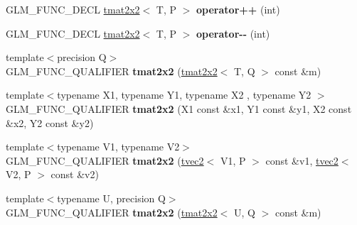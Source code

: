 \begin{DoxyCompactItemize}
\item 
\hypertarget{structglm_1_1detail_1_1tmat2x2_ab0857ca1fc8ebaf4f2999d64837efb08}{G\-L\-M\-\_\-\-F\-U\-N\-C\-\_\-\-D\-E\-C\-L \hyperlink{structglm_1_1detail_1_1tmat2x2}{tmat2x2}$<$ T, P $>$ {\bfseries operator++} (int)}\label{structglm_1_1detail_1_1tmat2x2_ab0857ca1fc8ebaf4f2999d64837efb08}

\item 
\hypertarget{structglm_1_1detail_1_1tmat2x2_a72d5fa6f7e0f9745d8615781a0f18d58}{G\-L\-M\-\_\-\-F\-U\-N\-C\-\_\-\-D\-E\-C\-L \hyperlink{structglm_1_1detail_1_1tmat2x2}{tmat2x2}$<$ T, P $>$ {\bfseries operator-\/-\/} (int)}\label{structglm_1_1detail_1_1tmat2x2_a72d5fa6f7e0f9745d8615781a0f18d58}

\item 
\hypertarget{structglm_1_1detail_1_1tmat2x2_ae0e7fef5869427ad788ea783dc2c87cc}{{\footnotesize template$<$precision Q$>$ }\\G\-L\-M\-\_\-\-F\-U\-N\-C\-\_\-\-Q\-U\-A\-L\-I\-F\-I\-E\-R {\bfseries tmat2x2} (\hyperlink{structglm_1_1detail_1_1tmat2x2}{tmat2x2}$<$ T, Q $>$ const \&m)}\label{structglm_1_1detail_1_1tmat2x2_ae0e7fef5869427ad788ea783dc2c87cc}

\item 
\hypertarget{structglm_1_1detail_1_1tmat2x2_a9f87e4050f867fd35e7440996f569ab9}{{\footnotesize template$<$typename X1, typename Y1, typename X2 , typename Y2 $>$ }\\G\-L\-M\-\_\-\-F\-U\-N\-C\-\_\-\-Q\-U\-A\-L\-I\-F\-I\-E\-R {\bfseries tmat2x2} (X1 const \&x1, Y1 const \&y1, X2 const \&x2, Y2 const \&y2)}\label{structglm_1_1detail_1_1tmat2x2_a9f87e4050f867fd35e7440996f569ab9}

\item 
\hypertarget{structglm_1_1detail_1_1tmat2x2_a469a15bf38fd19d4f7ad48f8599ea554}{{\footnotesize template$<$typename V1, typename V2$>$ }\\G\-L\-M\-\_\-\-F\-U\-N\-C\-\_\-\-Q\-U\-A\-L\-I\-F\-I\-E\-R {\bfseries tmat2x2} (\hyperlink{structglm_1_1detail_1_1tvec2}{tvec2}$<$ V1, P $>$ const \&v1, \hyperlink{structglm_1_1detail_1_1tvec2}{tvec2}$<$ V2, P $>$ const \&v2)}\label{structglm_1_1detail_1_1tmat2x2_a469a15bf38fd19d4f7ad48f8599ea554}

\item 
\hypertarget{structglm_1_1detail_1_1tmat2x2_a0eed2a609688233e8c0f3abe1e32d036}{{\footnotesize template$<$typename U, precision Q$>$ }\\G\-L\-M\-\_\-\-F\-U\-N\-C\-\_\-\-Q\-U\-A\-L\-I\-F\-I\-E\-R {\bfseries tmat2x2} (\hyperlink{structglm_1_1detail_1_1tmat2x2}{tmat2x2}$<$ U, Q $>$ const \&m)}\label{structglm_1_1detail_1_1tmat2x2_a0eed2a609688233e8c0f3abe1e32d036}


\end{DoxyCompactItemize}
